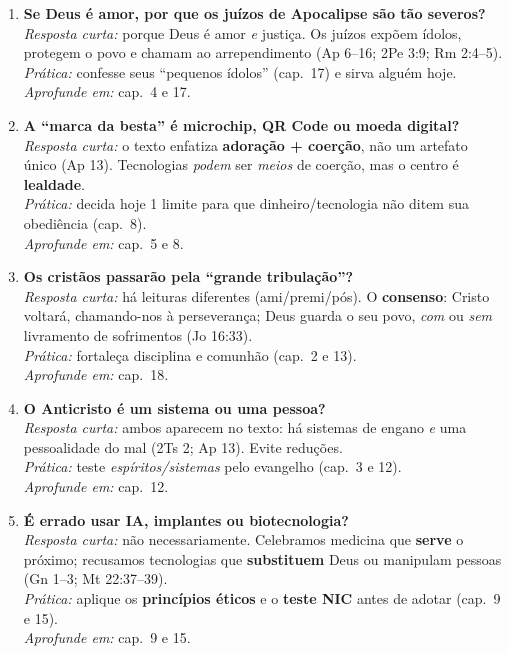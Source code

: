 \begin{enumerate}[leftmargin=*,label=\textbf{T\arabic*.}]
\item \textbf{Se Deus é amor, por que os juízos de Apocalipse são tão severos?}\\
\textit{Resposta curta:} porque Deus é amor \emph{e} justiça. Os juízos expõem ídolos, protegem o povo e chamam ao arrependimento (Ap 6--16; 2Pe 3:9; Rm 2:4--5).\\
\textit{Prática:} confesse seus ``pequenos ídolos'' (cap.~17) e sirva alguém hoje.\\
\textit{Aprofunde em:} cap.~4 e 17.

\item \textbf{A ``marca da besta'' é microchip, QR Code ou moeda digital?}\\
\textit{Resposta curta:} o texto enfatiza \textbf{adoração + coerção}, não um artefato único (Ap 13). Tecnologias \emph{podem} ser \emph{meios} de coerção, mas o centro é \textbf{lealdade}.\\
\textit{Prática:} decida hoje 1 limite para que dinheiro/tecnologia não ditem sua obediência (cap.~8).\\
\textit{Aprofunde em:} cap.~5 e 8.

\item \textbf{Os cristãos passarão pela ``grande tribulação''?}\\
\textit{Resposta curta:} há leituras diferentes (ami/premi/pós). O \textbf{consenso}: Cristo voltará, chamando-nos à perseverança; Deus guarda o seu povo, \emph{com} ou \emph{sem} livramento de sofrimentos (Jo 16:33).\\
\textit{Prática:} fortaleça disciplina e comunhão (cap.~2 e 13).\\
\textit{Aprofunde em:} cap.~18.

\item \textbf{O Anticristo é um sistema ou uma pessoa?}\\
\textit{Resposta curta:} ambos aparecem no texto: há sistemas de engano \emph{e} uma pessoalidade do mal (2Ts 2; Ap 13). Evite reduções.\\
\textit{Prática:} teste \emph{espíritos/sistemas} pelo evangelho (cap.~3 e 12).\\
\textit{Aprofunde em:} cap.~12.

\item \textbf{É errado usar IA, implantes ou biotecnologia?}\\
\textit{Resposta curta:} não necessariamente. Celebramos medicina que \textbf{serve} o próximo; recusamos tecnologias que \textbf{substituem} Deus ou manipulam pessoas (Gn 1--3; Mt 22:37--39).\\
\textit{Prática:} aplique os \textbf{princípios éticos} e o \textbf{teste NIC} antes de adotar (cap.~9 e 15).\\
\textit{Aprofunde em:} cap.~9 e 15.


\end{enumerate}
